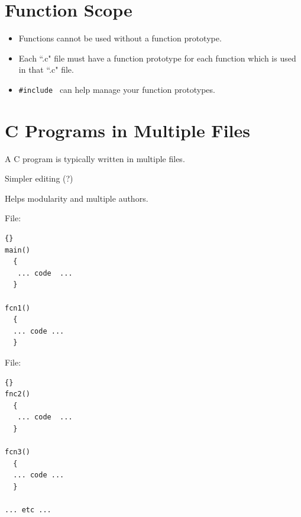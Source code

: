 

\section{Function Scope}
\begin{itemize}

  \item
  Functions cannot be used without a function prototype.

  \item
  Each ``.c" file must have a function prototype for each function which is used
  in that ``.c" file.

  \item
  {\tt \#include } can help manage your function prototypes.

\end{itemize}



\section{C Programs in Multiple Files}

A C program is typically written in multiple files.

Simpler editing (?)

Helps modularity and multiple authors.

    
File: 
\lstset{language=c}
\lstset{basicstyle=\ttfamily, commentstyle=\textit}
\begin{lstlisting}[frame=trbl]{}
main()
  {
   ... code  ...
  }

fcn1()
  {
  ... code ...
  }
\end{lstlisting}


File: 

\lstset{language=c}
\lstset{basicstyle=\ttfamily, commentstyle=\textit}
\begin{lstlisting}[frame=trbl]{}
fnc2()
  {
   ... code  ...
  }

fcn3()
  {
  ... code ...
  }

... etc ...
\end{lstlisting}


